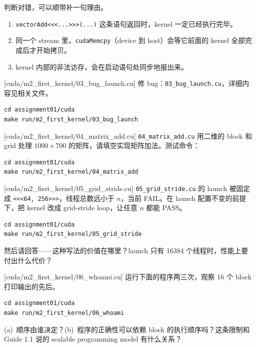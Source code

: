 \documentclass[11pt,a4paper,fontset=none]{ctexart}
\begin{document}
判断对错，可以顺带补一句理由。
\begin{enumerate}[label=(\alph*)]
  \item \texttt{vectorAdd<<<...>>>(...)} 这条语句返回时，kernel 一定已经执行完毕。
  \item 同一个 stream 里，\texttt{cudaMemcpy}（device 到 host）会等它前面的 kernel 全部完成后才开始拷贝。
  \item kernel 内部的非法访存，会在启动语句处同步地报出来。
\end{enumerate}

[cuda/m2\_first\_kernel/03\_bug\_launch.cu]
修 bug：\texttt{03\_bug\_launch.cu}，详细内容见相关文件。

\begin{lstlisting}
cd assignment01/cuda
make run/m2_first_kernel/03_bug_launch
\end{lstlisting}

[cuda/m2\_first\_kernel/04\_matrix\_add.cu]
\texttt{04\_matrix\_add.cu} 用二维的 block 和 grid 处理 $1000 \times 700$ 的矩阵，请填空实现矩阵加法。测试命令：

\begin{lstlisting}
cd assignment01/cuda
make run/m2_first_kernel/04_matrix_add
\end{lstlisting}

[cuda/m2\_first\_kernel/05\_grid\_stride.cu]
\texttt{05\_grid\_stride.cu} 的 launch 被固定成 \texttt{<<<64, 256>>>}，线程总数远小于 $n$，当前 FAIL。在 launch 配置不变的前提下，把 kernel 改成 grid-stride loop，让任意 $n$ 都能 PASS。

\begin{lstlisting}
cd assignment01/cuda
make run/m2_first_kernel/05_grid_stride
\end{lstlisting}

然后请回答——这种写法的价值在哪里？launch 只有 16384 个线程时，性能上要付出什么代价？

[cuda/m2\_first\_kernel/06\_whoami.cu]
运行下面的程序两三次，观察 16 个 block 打印输出的先后。

\begin{lstlisting}
cd assignment01/cuda
make run/m2_first_kernel/06_whoami
\end{lstlisting}

(a)~顺序由谁决定？(b)~程序的正确性可以依赖 block 的执行顺序吗？这条限制和 Guide 1.1 说的 scalable programming model 有什么关系？
\end{document}
